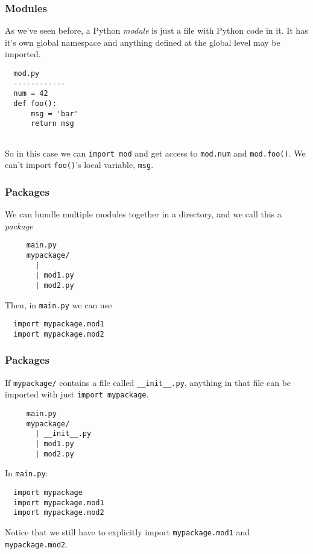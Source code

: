 \documentclass[10pt]{beamer}
\begin{document}
\begin{frame}[fragile]
  \frametitle{Modules}
  
  As we've seen before, a Python \emph{module} is just a file with Python code in it.
  It has it's own global namespace and anything defined at the global level may be imported.
  
  \begin{verbatim}
  mod.py
  ------------
  num = 42
  def foo():
      msg = 'bar'
      return msg
  
  \end{verbatim}
  
  So in this case we can \texttt{import mod} and get access to \texttt{mod.num} and \texttt{mod.foo()}.
  We can't import \texttt{foo()}'s local variable, \texttt{msg}.

\end{frame}

\begin{frame}[fragile]
  \frametitle{Packages}
  
  We can bundle multiple modules together in a directory, and we call this a \emph{package}
  
  \begin{verbatim}
     main.py
     mypackage/
       |
       | mod1.py
       | mod2.py
  \end{verbatim}
  
  Then, in \texttt{main.py} we can use
  
  \begin{verbatim}
  import mypackage.mod1
  import mypackage.mod2
  \end{verbatim}
\end{frame}

\begin{frame}[fragile]
  \frametitle{Packages}
  
  If \texttt{mypackage/} contains a file called \texttt{\_\_init\_\_.py}, anything
  in that file can be imported with just \texttt{import mypackage}.
  
  \begin{verbatim}
     main.py
     mypackage/
       | __init__.py
       | mod1.py
       | mod2.py
  \end{verbatim}
  
  In \texttt{main.py}:
  
  \begin{verbatim}
  import mypackage
  import mypackage.mod1
  import mypackage.mod2
  \end{verbatim}
  
  Notice that we still have to explicitly import \texttt{mypackage.mod1} and \texttt{mypackage.mod2}.
\end{frame}
\end{document}

